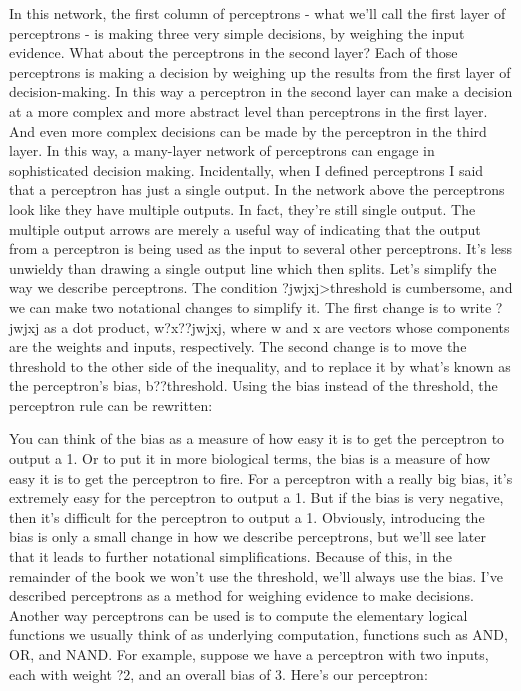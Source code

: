In this network, the first column of perceptrons - what we'll call the first layer of perceptrons - is making three very simple decisions, by weighing the input evidence. What about the perceptrons in the second layer? Each of those perceptrons is making a decision by weighing up the results from the first layer of decision-making. In this way a perceptron in the second layer can make a decision at a more complex and more abstract level than perceptrons in the first layer. And even more complex decisions can be made by the perceptron in the third layer. In this way, a many-layer network of perceptrons can engage in sophisticated decision making.
Incidentally, when I defined perceptrons I said that a perceptron has just a single output. In the network above the perceptrons look like they have multiple outputs. In fact, they're still single output. The multiple output arrows are merely a useful way of indicating that the output from a perceptron is being used as the input to several other perceptrons. It's less unwieldy than drawing a single output line which then splits.
Let's simplify the way we describe perceptrons. The condition ?jwjxj>threshold is cumbersome, and we can make two notational changes to simplify it. The first change is to write ?jwjxj as a dot product, w?x??jwjxj, where w and x are vectors whose components are the weights and inputs, respectively. The second change is to move the threshold to the other side of the inequality, and to replace it by what's known as the perceptron's bias, b??threshold. Using the bias instead of the threshold, the perceptron rule can be rewritten: 


You can think of the bias as a measure of how easy it is to get the perceptron to output a 1. Or to put it in more biological terms, the bias is a measure of how easy it is to get the perceptron to fire. For a perceptron with a really big bias, it's extremely easy for the perceptron to output a 1. But if the bias is very negative, then it's difficult for the perceptron to output a 1. Obviously, introducing the bias is only a small change in how we describe perceptrons, but we'll see later that it leads to further notational simplifications. Because of this, in the remainder of the book we won't use the threshold, we'll always use the bias.
I've described perceptrons as a method for weighing evidence to make decisions. Another way perceptrons can be used is to compute the elementary logical functions we usually think of as underlying computation, functions such as AND, OR, and NAND. For example, suppose we have a perceptron with two inputs, each with weight ?2, and an overall bias of 3. Here's our perceptron: 

